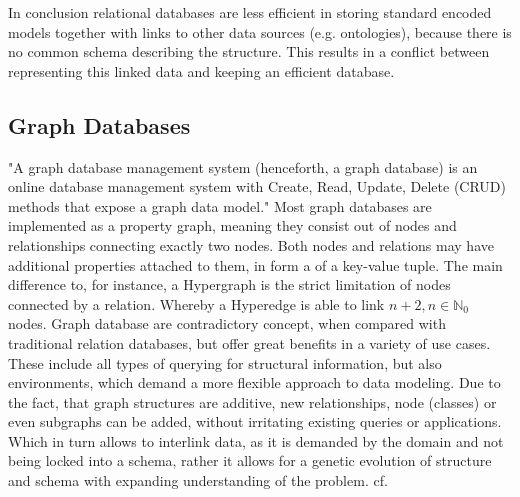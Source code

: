 In conclusion relational databases are less efficient in storing standard encoded models together with links to other data sources (e.g. ontologies), because there is no common schema describing the structure. This results in a conflict between representing this linked data and keeping an efficient database. \cite{Henkel2015}

\subsection{Graph Databases}
"A graph database management system (henceforth, a graph database) is an online database management system with Create, Read, Update, Delete (CRUD) methods that expose a graph data model." \cite{Robinson2013}
Most graph databases are implemented as a property graph, meaning they consist out of nodes and relationships connecting exactly two nodes. Both nodes and relations may have additional properties attached to them, in form a of a key-value tuple.
The main difference to, for instance, a Hypergraph is the strict limitation of nodes connected by a relation. Whereby a Hyperedge is able to link $n+2, n \in \mathbb{N}_0$ nodes. \cite[Appendix A]{Robinson2013}
Graph database are contradictory concept, when compared with traditional relation databases, but offer great benefits in a variety of use cases. These include all types of querying for structural information, but also environments, which demand a more flexible approach to data modeling. 
Due to the fact, that graph structures are additive, new relationships, node (classes) or even subgraphs can be added, without irritating existing queries or applications. Which in turn allows to interlink data, as it is demanded by the domain and not being locked into a schema, rather it allows for a genetic evolution of structure and schema with expanding understanding of the problem. cf. \cite{Robinson2013}

